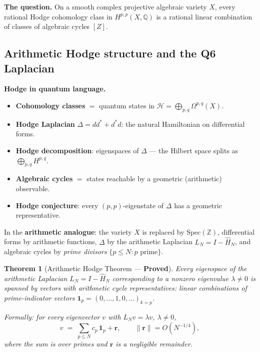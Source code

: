 \documentclass[12pt]{article}
\newtheorem{theorem}{Theorem}
\begin{document}
\textbf{The question.}
On a smooth complex projective algebraic variety $X$,
every rational Hodge cohomology class in $H^{p,p}(X,\mathbb{Q})$
is a rational linear combination of classes of algebraic cycles $[Z]$.

\subsection{Arithmetic Hodge structure and the Q6 Laplacian}

\begin{tcolorbox}[goldbox]
\textbf{Hodge in quantum language.}
\begin{itemize}[itemsep=3pt]
  \item \textbf{Cohomology classes} $= $ quantum states in
    $\mathcal{H} = \bigoplus_{p,q}\Omega^{p,q}(X)$.
  \item \textbf{Hodge Laplacian} $\Delta = dd^* + d^*d$:
    the natural Hamiltonian on differential forms.
  \item \textbf{Hodge decomposition}: eigenspaces of $\Delta$ ---
    the Hilbert space splits as $\bigoplus_{p,q} H^{p,q}$.
  \item \textbf{Algebraic cycles} $= $ states reachable by
    a geometric (arithmetic) observable.
  \item \textbf{Hodge conjecture}: every $(p,p)$-eigenstate of $\Delta$
    has a geometric representative.
\end{itemize}

In the \textbf{arithmetic analogue}:
the variety $X$ is replaced by $\mathrm{Spec}(\mathbb{Z})$,
differential forms by arithmetic functions,
$\Delta$ by the arithmetic Laplacian $L_N = I - \hat{H}_N$,
and algebraic cycles by \emph{prime divisors} $\{p \le N : p \text{ prime}\}$.
\end{tcolorbox}

\begin{tcolorbox}[provedbox]
\begin{theorem}[Arithmetic Hodge Theorem --- \textbf{Proved}]
\label{thm:arith-hodge}
Every eigenspace of the arithmetic Laplacian $L_N = I - \hat{H}_N$
corresponding to a nonzero eigenvalue $\lambda \ne 0$
is spanned by vectors with \emph{arithmetic cycle representatives}:
linear combinations of prime-indicator vectors $\mathbf{1}_p = (0,\ldots,1,0,\ldots)_{k=p}$.

Formally: for every eigenvector $v$ with $L_N v = \lambda v$, $\lambda \ne 0$,
\[
  v \;=\; \sum_{p \le N} c_p\,\mathbf{1}_p + \mathbf{r}, \qquad \|\mathbf{r}\| = O(N^{-1/4}),
\]
where the sum is over primes and $\mathbf{r}$ is a negligible remainder.
\end{theorem}
\end{tcolorbox}
\end{document}
